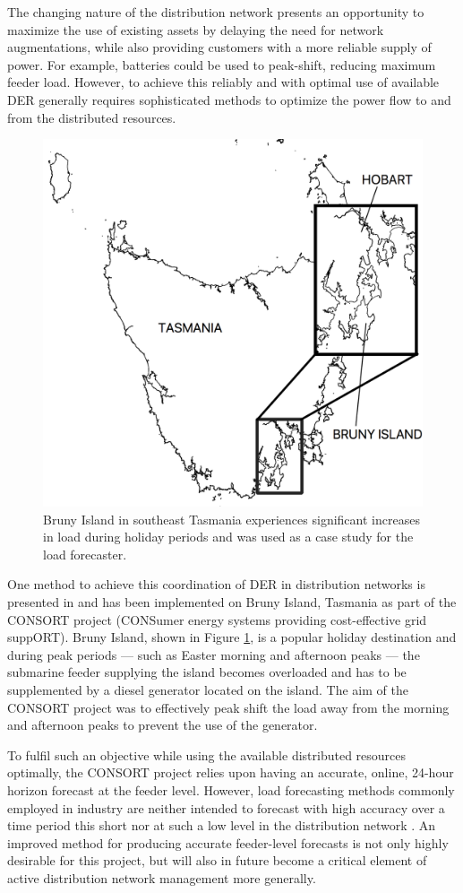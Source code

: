 \documentclass[conference]{IEEEtran}
\begin{document}
The changing nature of the distribution network presents an opportunity to maximize the use of existing assets by delaying the need for network augmentations, while also providing customers with a more reliable supply of power.
For example, batteries could be used to peak-shift, reducing maximum feeder load.
However, to achieve this reliably and with optimal use of available DER generally requires sophisticated methods to optimize the power flow to and from the distributed resources.

\begin{figure}[htbp]
	\centerline{\includegraphics[width=.35\textwidth]{images/bruny_island_map.png}}
	\caption{Bruny Island in southeast Tasmania experiences significant increases in load during holiday periods and was used as a case study for the load forecaster.}
	\label{fig:bruny_map}
\end{figure}

One method to achieve this coordination of DER in distribution networks is presented in \cite{Scott2014} and has been implemented on Bruny Island, Tasmania as part of the CONSORT project (CONSumer energy systems providing cost-effective grid suppORT).
Bruny Island, shown in Figure \ref{fig:bruny_map}, is a popular holiday destination and during peak periods --- such as Easter morning and afternoon peaks --- the submarine feeder supplying the island becomes overloaded and has to be supplemented by a diesel generator located on the island.
The aim of the CONSORT project was to effectively peak shift the load away from the morning and afternoon peaks to prevent the use of the generator.

To fulfil such an objective while using the available distributed resources optimally, the CONSORT project relies upon having an accurate, online, 24-hour horizon forecast at the feeder level.
However, load forecasting methods commonly employed in industry are neither intended to forecast with high accuracy over a time period this short nor at such a low level in the distribution network \cite{CIGRE2016}.
An improved method for producing accurate feeder-level forecasts is not only highly desirable for this project, but will also in future become a critical element of active distribution network management more generally.
\end{document}
